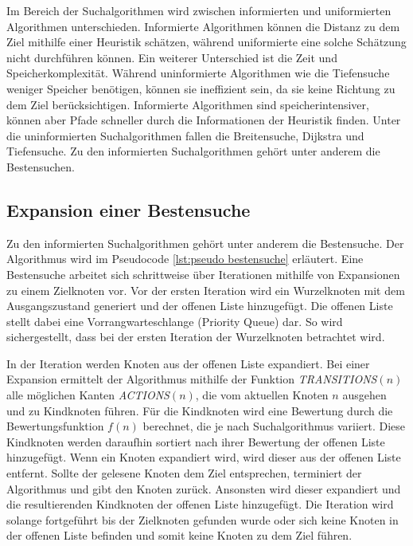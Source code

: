 Im Bereich der Suchalgorithmen wird zwischen informierten und uniformierten Algorithmen unterschieden. Informierte Algorithmen k\"{o}nnen die Distanz zu dem Ziel mithilfe einer Heuristik sch\"{a}tzen, w\"{a}hrend uniformierte eine solche Sch\"{a}tzung nicht durchf\"{u}hren k\"{o}nnen. Ein weiterer Unterschied ist die Zeit und Speicherkomplexit\"{a}t. W\"{a}hrend uninformierte Algorithmen wie die Tiefensuche weniger Speicher ben\"{o}tigen, k\"{o}nnen sie ineffizient sein, da sie keine Richtung zu dem Ziel ber\"{u}cksichtigen. Informierte Algorithmen sind speicherintensiver, k\"{o}nnen aber Pfade schneller durch die Informationen der Heuristik finden. Unter die uninformierten Suchalgorithmen fallen die Breitensuche, Dijkstra und Tiefensuche. Zu den informierten Suchalgorithmen geh\"{o}rt unter anderem die Bestensuchen.


\subsection{Expansion einer Bestensuche}
\label{chap:bestensuche}

Zu den informierten Suchalgorithmen geh\"{o}rt unter anderem die Bestensuche. Der Algorithmus wird im Pseudocode \ref{lst:pseudo bestensuche} erläutert. Eine Bestensuche arbeitet sich schrittweise \"{u}ber Iterationen mithilfe von Expansionen zu einem Zielknoten vor. Vor der ersten Iteration wird ein Wurzelknoten mit dem Ausgangszustand generiert und der offenen Liste hinzugef\"{u}gt. Die offenen Liste stellt dabei eine Vorrangwarteschlange (Priority Queue) dar. So wird sichergestellt, dass bei der ersten Iteration der Wurzelknoten betrachtet wird.

In der Iteration werden Knoten aus der offenen Liste expandiert. Bei einer Expansion ermittelt der Algorithmus mithilfe der Funktion \textit{TRANSITIONS}$(n)$ alle m\"{o}glichen Kanten \textit{ACTIONS}$(n)$, die vom aktuellen Knoten $n$ ausgehen und zu Kindknoten f\"{u}hren. F\"{u}r die Kindknoten wird eine Bewertung durch die Bewertungsfunktion $f(n)$ berechnet, die je nach Suchalgorithmus variiert. Diese Kindknoten werden daraufhin sortiert nach ihrer Bewertung der offenen Liste hinzugef\"{u}gt. Wenn ein Knoten expandiert wird, wird dieser aus der offenen Liste entfernt. Sollte der gelesene Knoten dem Ziel entsprechen, terminiert der Algorithmus und gibt den Knoten zur\"{u}ck. Ansonsten wird dieser expandiert und die resultierenden Kindknoten der offenen Liste hinzugef\"{u}gt. Die Iteration wird solange fortgef\"{u}hrt bis der Zielknoten gefunden wurde oder sich keine Knoten in der offenen Liste befinden und somit keine Knoten zu dem Ziel f\"{u}hren.

